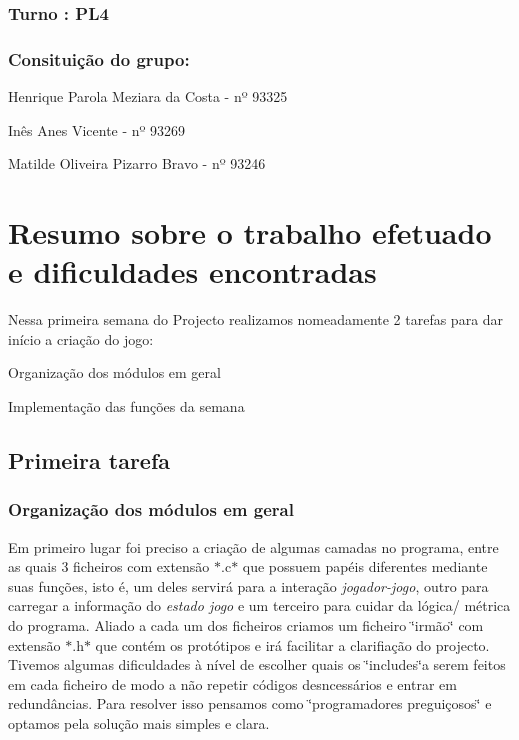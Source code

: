 \subsubsection*{Turno \+: P\+L4}

\subsubsection*{}

\subsubsection*{Consituição do grupo\+:}


\begin{DoxyItemize}
\item Henrique Parola Meziara da Costa -\/ nº 93325
\item Inês Anes Vicente -\/ nº 93269
\item Matilde Oliveira Pizarro Bravo -\/ nº 93246
\end{DoxyItemize}

\section*{Resumo sobre o trabalho efetuado e dificuldades encontradas}

\begin{DoxyVerb}Nessa primeira semana do Projecto realizamos nomeadamente 2 tarefas para dar início a criação do jogo:
\end{DoxyVerb}



\begin{DoxyItemize}
\item Organização dos módulos em geral
\item Implementação das funções da semana
\end{DoxyItemize}

\subsection*{Primeira tarefa}

\subsubsection*{Organização dos módulos em geral}

Em primeiro lugar foi preciso a criação de algumas camadas no programa, entre as quais 3 ficheiros com extensão $\ast$.c$\ast$ que possuem papéis diferentes mediante suas funções, isto é, um deles servirá para a interação {\itshape jogador-\/jogo}, outro para carregar a informação do {\itshape estado jogo} e um terceiro para cuidar da lógica/ métrica do programa. Aliado a cada um dos ficheiros criamos um ficheiro \char`\"{}irmão\char`\"{} com extensão $\ast$.h$\ast$ que contém os protótipos e irá facilitar a clarifiação do projecto. Tivemos algumas dificuldades à nível de escolher quais os \char`\"{}includes\char`\"{}a serem feitos em cada ficheiro de modo a não repetir códigos desncessários e entrar em redundâncias. Para resolver isso pensamos como \char`\"{}programadores preguiçosos\char`\"{} e optamos pela solução mais simples e clara.

